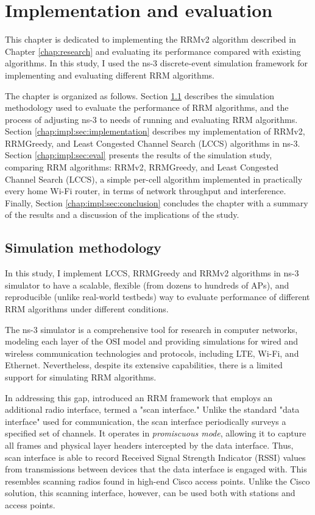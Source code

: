 \chapter{Implementation and evaluation}
\label{chap:impl}

This chapter is dedicated to implementing the RRMv2 algorithm described in Chapter \ref{chap:research} and evaluating its performance compared with existing algorithms. In this study, I used the ns-3 discrete-event simulation framework for implementing and evaluating different RRM algorithms.

The chapter is organized as follows.
Section \ref{chap:impl:sec:simulation_method} describes the simulation methodology used to evaluate the performance of RRM algorithms, and the process of adjusting ns-3 to needs of running and evaluating RRM algorithms.
Section \ref{chap:impl:sec:implementation} describes my implementation of RRMv2, RRMGreedy, and Least Congested Channel Search (LCCS) algorithms in ns-3.
Section \ref{chap:impl:sec:eval} presents the results of the simulation study, comparing RRM algorithms: RRMv2, RRMGreedy, and Least Congested Channel Search (LCCS), a simple per-cell algorithm implemented in practically every home Wi-Fi router, in terms of network throughput and interference.
Finally, Section \ref{chap:impl:sec:conclusion} concludes the chapter with a summary of the results and a discussion of the implications of the study.

\section{Simulation methodology}
\label{chap:impl:sec:simulation_method}
In this study, I implement LCCS, RRMGreedy and RRMv2 algorithms in ns-3 simulator to have a scalable, flexible (from dozens to hundreds of APs), and reproducible (unlike real-world testbeds) way to evaluate performance of different RRM algorithms under different conditions.

The ns-3 simulator is a comprehensive tool for research in computer networks, modeling each layer of the OSI model and providing simulations for wired and wireless communication technologies and protocols, including LTE, Wi-Fi, and Ethernet. Nevertheless, despite its extensive capabilities, there is a limited support for simulating RRM algorithms.

In addressing this gap, \cite{bharadwajSimulationFrameworkRadio2017} introduced an RRM framework that employs an additional radio interface, termed a "scan interface." Unlike the standard "data interface" used for communication, the scan interface periodically surveys a specified set of channels. It operates in \textit{promiscuous mode}, allowing it to capture all frames and physical layer headers intercepted by the data interface. Thus, scan interface is able to record Received Signal Strength Indicator (RSSI) values from transmissions between devices that the data interface is engaged with. This resembles scanning radios found in high-end Cisco access points. Unlike the Cisco solution, this scanning interface, however, can be used both with stations and access points.

